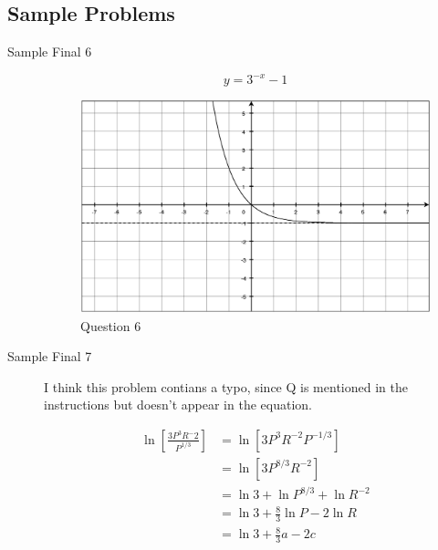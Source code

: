 \documentclass[fleqn,addpoints]{exam}
\begin{document}
\subsection{Sample Problems}

\begin{description}

\item[Sample Final 6]
\[
 y = 3^{-x} - 1
\]


\begin{figure}[H]
  \centering
  \includegraphics[scale=.5]{final_6.eps}
  \caption*{Question 6}
\end{figure}

\item[Sample Final 7]

I think this problem contians a typo, since Q is mentioned in the instructions but doesn't appear in the equation.

\begin{align*}
  \ln \left[ \frac{3 P^3 R^-2}{P^{1/3}} \right] &= \ln [ 3P^3 R^{-2} P^{-1/3} ] \\
  &= \ln [ 3P^{8/3} R^{-2} ] \\
  &= \ln 3 + \ln P^{8/3} + \ln R^{-2}  \\
  &= \ln 3 + \frac{8}{3} \ln P - 2 \ln R  \\
  &= \ln 3 + \frac{8}{3} a - 2 c  \\
\end{align*}


\end{description}
\end{document}
